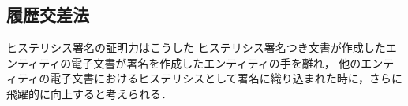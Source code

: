 \documentclass[a4paper,12pt]{jsarticle}
\begin{document}





      \subsection{履歴交差法}
ヒステリシス署名の証明力はこうした
ヒステリシス署名つき文書が作成したエンティティの電子文書が署名を作成したエンティティの手を離れ，
他のエンティティの電子文書におけるヒステリシスとして署名に織り込まれた時に，さらに飛躍的に向上すると考えられる．
\end{document}
